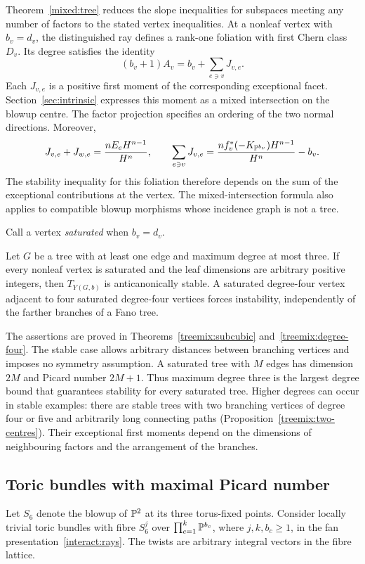 Theorem~\ref{mixed:tree} reduces the slope inequalities for subspaces
meeting any number of factors to the stated vertex inequalities.
At a nonleaf vertex with
$b_v=d_v$, the distinguished ray defines a rank-one foliation with
first Chern class $D_v$. Its degree satisfies the identity
\[
 (b_v+1)A_v=b_v+\sum_{e\ni v}J_{v,e}.
\]
Each $J_{v,e}$ is a positive first moment of the corresponding
exceptional facet. Section~\ref{sec:intrinsic} expresses this moment
as a mixed intersection on the blowup centre. The factor projection
specifies an ordering of the two normal directions. Moreover,
\[
 J_{v,e}+J_{w,e}=\frac{nE_eH^{n-1}}{H^n},\qquad
 \sum_{e\ni v}J_{v,e}
 =\frac{nf_v^*(-K_{\mathbb{P}^{b_v}})H^{n-1}}{H^n}-b_v.
\]
The stability inequality for this foliation therefore depends on the
sum of the exceptional contributions at the vertex. The mixed-intersection
formula also applies to compatible blowup morphisms whose incidence
graph is not a tree.

Call a vertex \emph{saturated} when $b_v=d_v$.
\begin{theorem}\label{thm:mixed-trees-intro}
Let $G$ be a tree with at least one edge and maximum degree at most
three. If every nonleaf vertex is saturated and the leaf dimensions
are arbitrary positive integers, then $T_{Y(G,b)}$ is anticanonically
stable. A saturated degree-four vertex adjacent to four
saturated degree-four vertices forces instability, independently of
the farther branches of a Fano tree.
\end{theorem}

The assertions are proved in Theorems~\ref{treemix:subcubic}
and~\ref{treemix:degree-four}. The stable case allows arbitrary distances
between branching vertices and imposes no symmetry assumption. A saturated tree
with $M$ edges has dimension $2M$ and Picard number $2M+1$.
Thus maximum degree three is the largest degree bound that guarantees
stability for every saturated tree. Higher degrees can occur in stable
examples: there are stable trees with two branching vertices of degree
four or five and arbitrarily long connecting paths
(Proposition~\ref{treemix:two-centres}). Their exceptional first moments
depend on the dimensions of neighbouring factors and the arrangement
of the branches.

\subsection*{Toric bundles with maximal Picard number}
Let $S_6$ denote the blowup of $\mathbb{P}^2$ at its three torus-fixed points.
Consider locally trivial toric bundles with fibre $S_6^j$ over
$\prod_{c=1}^k\mathbb{P}^{b_c}$, where $j,k,b_c\ge1$, in the fan
presentation~\eqref{interact:rays}. The twists are arbitrary integral
vectors in the fibre lattice.

